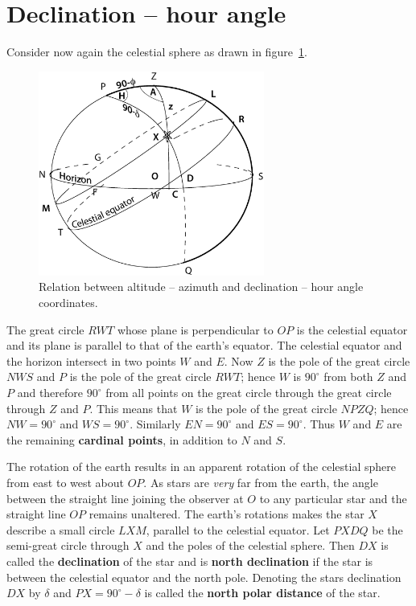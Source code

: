 \section{Declination -- hour angle}

Consider now again the celestial sphere as drawn in figure~\ref{fig:hr-dec}.

\begin{figure}[h]
\centering
\includegraphics[width=0.66\textwidth]{hr-dec.eps}
\caption{Relation between altitude -- azimuth and declination -- hour angle
coordinates.}
\label{fig:hr-dec}
\end{figure}

The great circle $RWT$ whose plane is perpendicular to $OP$ is the
celestial equator and its plane is parallel to that of the
earth's equator. The celestial equator and the horizon intersect in
two points $W$ and $E$. Now $Z$ is the pole of the great circle $NWS$
and $P$ is the pole of the great circle $RWT$; hence $W$ is $90^\circ$
from both $Z$ and $P$ and therefore $90^\circ$ from all points on the
great circle through the great circle through $Z$ and $P$. This means
that $W$ is the pole of the great circle $NPZQ$; hence $NW=90^\circ$
and $WS=90^\circ$. Similarly  $EN=90^\circ$ and  $ES=90^\circ$. Thus
$W$ and $E$ are the remaining {\bf cardinal points}, in addition to
$N$ and $S$. 

The rotation of the earth results in an apparent rotation of the
celestial sphere from east to west about $OP$. As stars are {\it very}
far from the earth, the angle between the straight line joining the
observer at $O$ to any particular star and the straight line $OP$
remains unaltered. The earth's rotations makes the star $X$ describe a
small circle $LXM$, parallel to the celestial equator. Let $PXDQ$ be
the semi-great circle through $X$ and the poles of the celestial
sphere. Then $DX$ is called the {\bf declination} of the star and is
{\bf north declination} if the star is between the celestial equator and
the north pole. Denoting the stars declination $DX$ by $\delta$ and
$PX=90^\circ-\delta$ is called the {\bf north polar distance} of the
star. 

